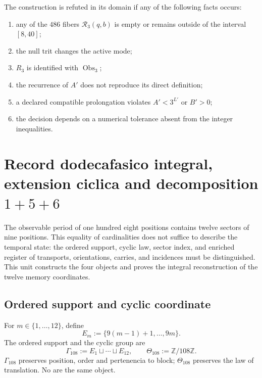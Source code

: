 {\begin{criterion}
\label{p12-83-c1-s8:crit:u006a-refutacion}
The construction is refuted in its domain if any of the following
facts occurs:
\begin{enumerate}
 \item any of the \(486\) fibers \(\mathcal R_3(q,b)\) is empty or remains
       outside of the interval \([8,40]\);
 \item the null trit changes the active mode;
 \item \(R_3\) is identified with \(\operatorname{Obs}_3\);
 \item the recurrence of \(A'\) does not reproduce its direct definition;
 \item a declared compatible prolongation violates \(A'<3^{L'}\) or
       \(B'>0\);
 \item the decision depends on a numerical tolerance absent from the
       integer inequalities.
\end{enumerate}
\end{criterion}



\section{Record dodecafasico integral, extension ciclica and decomposition \texorpdfstring{\(1+5+6\)}{1+5+6}}
\label{p12-83-c1-s9:chap:registro-dodecafasico-integral}

The observable period of one hundred eight positions contains twelve sectors of
nine positions. This equality of cardinalities does not suffice to describe the
temporal state: the ordered support, cyclic law, sector index, and
enriched register of transports, orientations, carries, and incidences must be
distinguished. This unit constructs the four objects and proves
the integral reconstruction of the twelve memory coordinates.

\subsection{Ordered support and cyclic coordinate}

For \(m\in\{1,\ldots,12\}\), define
\begin{equation}
 E_m:=\{9(m-1)+1,\ldots,9m\}.
 \label{p12-83-c1-s9:eq:u006d-bloques-nonadicos}
\end{equation}
The ordered support and the cyclic group are
\begin{equation}
 \Gamma_{108}:=
 E_1\sqcup\cdots\sqcup E_{12},
 \qquad
 \Theta_{108}:=\mathbb Z/108\mathbb Z.
 \label{p12-83-c1-s9:eq:u006d-gamma-theta}
\end{equation}
\(\Gamma_{108}\) preserves position, order and pertenencia to block;
\(\Theta_{108}\) preserves the law of translation. No are the same object.

}
